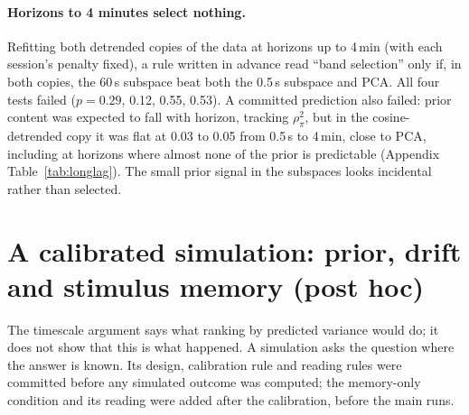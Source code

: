 \documentclass{article}
\begin{document}
\paragraph{Horizons to 4 minutes select nothing.} Refitting both detrended copies of the data at horizons up to
4\,min (with each session's penalty fixed), a rule written in advance read ``band selection'' only if, in both copies,
the 60\,s subspace beat both the 0.5\,s subspace and PCA. All four tests failed ($p = 0.29$, 0.12, 0.55, 0.53). A
committed prediction also failed: prior content was expected to fall with horizon, tracking $\rho_\pi^2$, but in the
cosine-detrended copy it was flat at 0.03 to 0.05 from 0.5\,s to 4\,min, close to PCA, including at horizons where
almost none of the prior is predictable (Appendix Table~\ref{tab:longlag}). The small prior signal in the subspaces looks incidental rather than selected.

\section{A calibrated simulation: prior, drift and stimulus memory (post hoc)}
\label{sec:sim}

The timescale argument says what ranking by predicted variance would do; it does not show that this is what happened.
A simulation asks the question where the answer is known. Its design, calibration rule and reading rules were
committed before any simulated outcome was computed; the memory-only condition and its reading were added after the
calibration, before the main runs.
\end{document}
